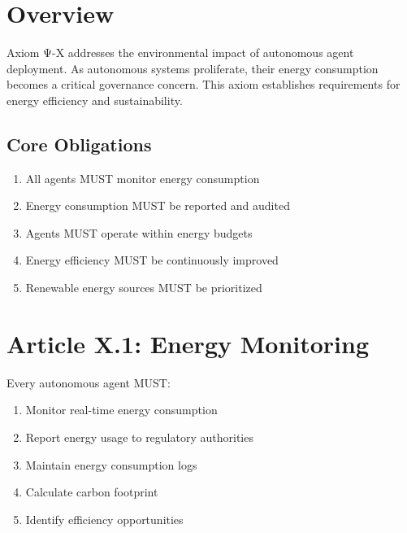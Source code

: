 \vspace{0.5cm}

\section{Overview}

Axiom Ψ-X addresses the environmental impact of autonomous agent deployment. As autonomous systems proliferate, their energy consumption becomes a critical governance concern. This axiom establishes requirements for energy efficiency and sustainability.

\subsection{Core Obligations}

\begin{enumerate}
    \item All agents MUST monitor energy consumption
    \item Energy consumption MUST be reported and audited
    \item Agents MUST operate within energy budgets
    \item Energy efficiency MUST be continuously improved
    \item Renewable energy sources MUST be prioritized
\end{enumerate}

\vspace{0.5cm}

\section{Article X.1: Energy Monitoring}

\begin{articlebox}
Every autonomous agent MUST:
\begin{enumerate}
    \item Monitor real-time energy consumption
    \item Report energy usage to regulatory authorities
    \item Maintain energy consumption logs
    \item Calculate carbon footprint
    \item Identify efficiency opportunities
\end{enumerate}
\end{articlebox}

\vspace{0.5cm}

